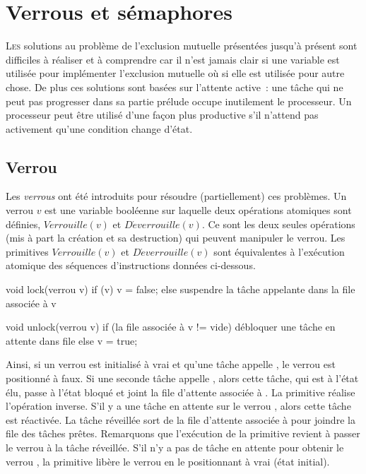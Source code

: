 \chapter{Verrous et sémaphores}
\startchapter

\lettrine[lines=3]{L}{es} solutions au problème de l'exclusion mutuelle présentées jusqu'à présent sont difficiles à réaliser et à comprendre car il n'est jamais clair si une variable est utilisée pour implémenter l'exclusion mutuelle où si elle est utilisée pour autre chose.
De plus ces solutions sont basées sur l'attente active~:  une tâche qui ne peut pas progresser dans sa partie prélude occupe inutilement le processeur.  Un processeur peut être utilisé d'une façon plus productive s'il n'attend pas activement qu'une condition change d'état.

\section{Verrou}\label{verrou:intro}
Les {\em verrous} ont été introduits pour résoudre (partiellement) ces problèmes. Un verrou $v$ est une variable booléenne sur laquelle deux opérations atomiques sont définies, $Verrouille(v)$ et $D\acute{e}verrouille(v)$.  Ce sont les deux seules opérations (mis à part la création et sa destruction) qui peuvent manipuler le verrou.
Les primitives $Verrouille(v)$ et $D\acute{e}verrouille(v)$ sont équivalentes à l'exécution atomique des séquences d'instructions données ci-dessous.

\begin{codeblock}[label=verrou:code,title=Vérouille et dévérouille]
void lock(verrou v) {
  if (v)
    v = false;
  else
    suspendre la tâche appelante dans la file associée à v
}

void unlock(verrou v) {
  if (la file associée à v != vide)
    débloquer une tâche en attente dans file
  else
    v = true;
}
\end{codeblock}

\par
Ainsi, si un verrou  est initialisé à vrai et qu'une tâche appelle , le verrou est positionné à faux. Si une seconde tâche appelle , alors cette tâche, qui est à l'état élu, passe à l'état bloqué et joint la file d'attente associée à .
La primitive  réalise l'opération inverse. S'il y a une tâche en attente sur le verrou , alors cette tâche est réactivée. La tâche réveillée sort de la file d'attente associée à  pour joindre la file des tâches prêtes. Remarquons que l'exécution de la primitive  revient à passer le verrou  à la tâche réveillée.
S'il n'y a pas de tâche en attente pour obtenir le verrou , la primitive  libère le verrou  en le positionnant à vrai (état initial).

